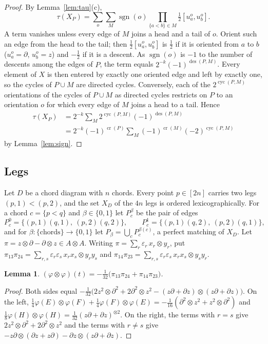 \documentclass[11pt,a4paper,reqno]{amsart}
\newtheorem{lemma}[theorem]{Lemma}
\theoremstyle{definition}
\newcommand{\cro}{\operatorname{cr}}
\newcommand{\cyc}{\operatorname{cyc}}
\newcommand{\des}{\operatorname{des}}
\newcommand{\dd}{\partial}
\begin{document}
\begin{proof}
By Lemma~\ref{lem:tau}(c),
\[
\tau(X_P)=\sum_o\sum_M\operatorname{sgn}(o)\prod_{\{a<b\}\in M}\tfrac12[u^o_a,u^o_b].
\]
A term vanishes unless every edge of $M$ joins a head and a tail of $o$. Orient such an edge from the head to the tail; then $\frac12[u^o_a,u^o_b]$ is $\frac12$ if it is oriented from $a$ to $b$ ($u^o_a=\dd$, $u^o_b=z$) and $-\frac12$ if it is a descent. As $\operatorname{sgn}(o)$ is $-1$ to the number of descents among the edges of $P$, the term equals $2^{-k}(-1)^{\des(P,M)}$. Every element of $X$ is then entered by exactly one oriented edge and left by exactly one, so the cycles of $P\cup M$ are directed cycles. Conversely, each of the $2^{\cyc(P,M)}$ orientations of the cycles of $P\cup M$ as directed cycles restricts on $P$ to an orientation $o$ for which every edge of $M$ joins a head to a tail. Hence
\begin{align*}
\tau(X_P)&=2^{-k}\sum_M2^{\cyc(P,M)}(-1)^{\des(P,M)}\\
&=2^{-k}(-1)^{\cro(P)}\sum_M(-1)^{\cro(M)}(-2)^{\cyc(P,M)}
\end{align*}
by Lemma~\ref{lem:sign}.
\end{proof}

\subsection{Legs}
Let $D$ be a chord diagram with $n$ chords. Every point $p\in[2n]$ carries two legs $(p,1)<(p,2)$, and the set $X_D$ of the $4n$ legs is ordered lexicographically. For a chord $c=\{p<q\}$ and $\beta\in\{0,1\}$ let $P_c^\beta$ be the pair of edges
\[
P_c^0=\{(p,1)(q,1),\ (p,2)(q,2)\},\qquad P_c^1=\{(p,1)(q,2),\ (p,2)(q,1)\},
\]
and for $\beta\colon\{\text{chords}\}\to\{0,1\}$ let $P_\beta=\bigcup_cP_c^{\beta(c)}$, a perfect matching of $X_D$. Let $\pi=z\otimes\dd-\dd\otimes z\in A\otimes A$. Writing $\pi=\sum_r\varepsilon_r\,x_r\otimes y_r$, put $\pi_{13}\pi_{24}=\sum_{r,s}\varepsilon_r\varepsilon_s\,x_rx_s\otimes y_ry_s$ and $\pi_{14}\pi_{23}=\sum_{r,s}\varepsilon_r\varepsilon_s\,x_rx_s\otimes y_sy_r$.

\begin{lemma}\label{lem:pi}
$(\varphi\otimes\varphi)(t)=-\frac{1}{32}\bigl(\pi_{13}\pi_{24}+\pi_{14}\pi_{23}\bigr)$.
\end{lemma}

\begin{proof}
Both sides equal $-\frac1{32}\bigl(2z^2\otimes\dd^2+2\dd^2\otimes z^2-(z\dd+\dd z)\otimes(z\dd+\dd z)\bigr)$. On the left, $\frac14\varphi(E)\otimes\varphi(F)+\frac14\varphi(F)\otimes\varphi(E)=-\frac1{16}(\dd^2\otimes z^2+z^2\otimes\dd^2)$ and $\frac18\varphi(H)\otimes\varphi(H)=\frac1{32}(z\dd+\dd z)^{\otimes2}$. On the right, the terms with $r=s$ give $2z^2\otimes\dd^2+2\dd^2\otimes z^2$ and the terms with $r\ne s$ give $-z\dd\otimes(\dd z+z\dd)-\dd z\otimes(z\dd+\dd z)$.
\end{proof}
\end{document}

